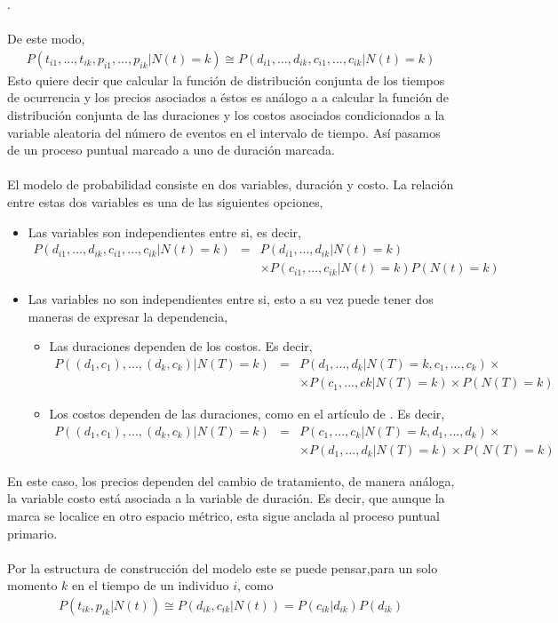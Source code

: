 .\\
\\
De este modo,
\begin{align}
P(t_{i1},...,t_{ik},p_{i1},...,p_{ik}|N(t)=k) \cong P(d_{i1},...,d_{ik},c_{i1},...,c_{ik}|N(t)=k)
\end{align}
Esto quiere decir que calcular la funci\'on de distribuci\'on conjunta de los tiempos de ocurrencia y los precios asociados a \'estos es an\'alogo a a calcular la funci\'on de distribuci\'on conjunta de las duraciones y los costos asociados condicionados a la variable aleatoria del n\'umero de eventos en el intervalo de tiempo. As\'i pasamos de un proceso puntual marcado a uno de duraci\'on marcada.\\
\\
El modelo de probabilidad consiste en dos variables, duraci\'on y costo. La relaci\'on entre estas dos variables es una de las siguientes opciones,
\begin{itemize}
\item Las variables son independientes entre si, es decir,
\begin{eqnarray*}
P(d_{i1},...,d_{ik},c_{i1},...,c_{ik}|N(t)=k)&=&P(d_{i1},...,d_{ik}|N(t)=k)\\
&&\times P(c_{i1},...,c_{ik}|N(t)=k)P(N(t)=k)
\end{eqnarray*}
\item Las variables no son independientes entre si, esto a su vez puede tener dos maneras de expresar la dependencia,
	\begin{itemize}
	\item Las duraciones dependen de los costos. Es decir,
	\begin{eqnarray*}
	P((d_1,c_1),...,(d_k,c_k)|N(T)=k)&=& P(d_1,...,d_k|N(T)=k,c_1,...,c_k)\times \\
								 && \times P(c_1,...,ck|N(T)=k)\times P(N(T)=k)
	\end{eqnarray*}
	\item Los costos dependen de las duraciones, como en el art\'iculo de \cite{engle1998autoregressive}. Es decir,
	\begin{eqnarray*}
     P((d_1,c_1),...,(d_k,c_k)|N(T)=k)&=& P(c_1,...,c_k|N(T)=k,d_1,...,d_k)\times \\
								 && \times P(d_1,...,d_k|N(T)=k)\times P(N(T)=k)
    \end{eqnarray*}	
	\end{itemize}
\end{itemize}
En este caso, los precios dependen del cambio de tratamiento, de manera an\'aloga, la variable costo est\'a asociada a la variable de duraci\'on. Es decir, que aunque la marca se localice en otro espacio m\'etrico, esta sigue anclada al proceso puntual primario.\\
\\
Por la estructura de construcci\'on del modelo este se puede pensar,para un solo momento $k$ en el tiempo de un individuo $i$, como
\begin{align}
P(t_{ik},p_{ik}|N(t))\cong P(d_{ik},c_{ik}|N(t)) = P(c_{ik}|d_{ik})P(d_{ik})
\end{align}

